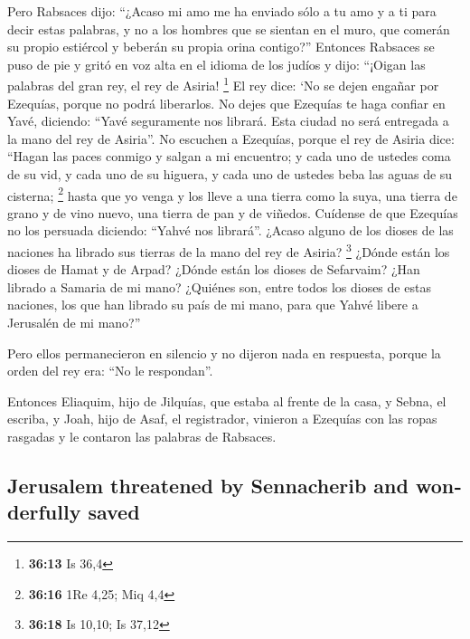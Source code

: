 \begin{paracol}{2}
 Pero Rabsaces dijo: ``¿Acaso mi amo me ha enviado sólo a
tu amo y a ti para decir estas palabras, y no a los hombres que se
sientan en el muro, que comerán su propio estiércol y beberán su propia
orina contigo?''  Entonces Rabsaces se puso de pie y
gritó en voz alta en el idioma de los judíos y dijo: ``¡Oigan las
palabras del gran rey, el rey de Asiria! \footnote{\textbf{36:13} Is
  36,4}  El rey dice: `No se dejen engañar por Ezequías,
porque no podrá liberarlos.  No dejes que Ezequías te
haga confiar en Yavé, diciendo: ``Yavé seguramente nos librará. Esta
ciudad no será entregada a la mano del rey de Asiria''. 
No escuchen a Ezequías, porque el rey de Asiria dice: ``Hagan las paces
conmigo y salgan a mi encuentro; y cada uno de ustedes coma de su vid, y
cada uno de su higuera, y cada uno de ustedes beba las aguas de su
cisterna; \footnote{\textbf{36:16} 1Re 4,25; Miq 4,4} 
hasta que yo venga y los lleve a una tierra como la suya, una tierra de
grano y de vino nuevo, una tierra de pan y de viñedos. 
Cuídense de que Ezequías no los persuada diciendo: ``Yahvé nos
librará''. ¿Acaso alguno de los dioses de las naciones ha librado sus
tierras de la mano del rey de Asiria? \footnote{\textbf{36:18} Is 10,10;
  Is 37,12}  ¿Dónde están los dioses de Hamat y de Arpad?
¿Dónde están los dioses de Sefarvaim? ¿Han librado a Samaria de mi mano?
 ¿Quiénes son, entre todos los dioses de estas naciones,
los que han librado su país de mi mano, para que Yahvé libere a
Jerusalén de mi mano?''

 Pero ellos permanecieron en silencio y no dijeron nada
en respuesta, porque la orden del rey era: ``No le respondan''.

 Entonces Eliaquim, hijo de Jilquías, que estaba al
frente de la casa, y Sebna, el escriba, y Joah, hijo de Asaf, el
registrador, vinieron a Ezequías con las ropas rasgadas y le contaron
las palabras de Rabsaces.

\switchcolumn
\begin{otherlanguage}{english}

\hypertarget{jerusalem-threatened-by-sennacherib-and-wonderfully-saved}{%
\subsection{Jerusalem threatened by Sennacherib and wonderfully
saved}\label{jerusalem-threatened-by-sennacherib-and-wonderfully-saved}}


\end{otherlanguage}
\end{paracol}
